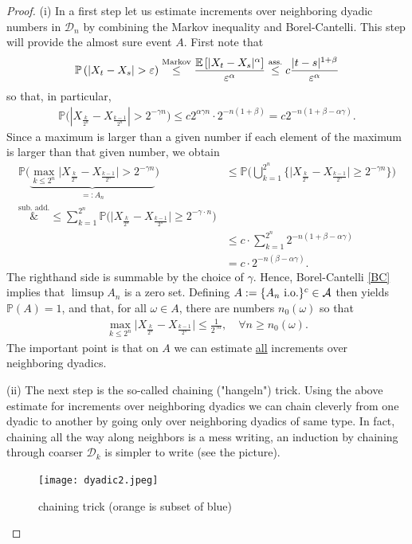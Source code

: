 \begin{proof}[Proof]
	(i) In a first step let us estimate increments over neighboring dyadic numbers in $\mathcal D_n$ by combining the Markov inequality and Borel-Cantelli. This step will provide the almost sure event $A$. First note that 
			\begin{align}\label{P}
				\mathbb{P}\left(\lvert X_t - X_s \rvert > \varepsilon \right) \overset{\text{Markov}}{\leq}  \frac{\mathbb{E}\left[ \lvert X_t - X_s \rvert^{\alpha} \right]}{\varepsilon^{\alpha}} \overset{\text{ass.}}{\leq} c  \frac{\lvert t -s \rvert^{1+\beta}}{\varepsilon^{\alpha}}
			\end{align}
			so that, in particular,
			\begin{align*}
				\mathbb{P}\big(| X_{\frac{k}{2^n}} - X_{\frac{k-1}{2^n}}| > 2^{-\gamma  n}\big) 
				\leq c  2^{\alpha \gamma n} \cdot 2^{-n(1+\beta)} 
				= c  2^{-n (1+\beta - \alpha \gamma)}.
			\end{align*}
			Since a maximum is larger than a given number if each element of the maximum is larger than that given number, we obtain
			\begin{align*}
				\mathbb{P} \big( \underbrace{\max_{k\leq 2^n} \lvert X_{\frac{k}{2^n}} - X_{\frac{k-1}{2^n}} \rvert > 2^{-\gamma  n}}_{=:A_n} \big) 
				&\leq \mathbb{P} \Big( \bigcup_{k=1}^{2^n} \big\{ \big\lvert X_{\frac{k}{2^n}} - X_{\frac{k-1}{2^n}}\big\rvert \geq 2^{-\gamma  n}\big\}\Big) \\
				\overset{\text{sub. add.}}&{\leq} \sum_{k=1}^{2^n} \mathbb{P}\big( \lvert X_{\frac{k}{2^n}} - X_{\frac{k-1}{2^n}}\big\rvert \geq 2^{-\gamma \cdot n}\big) \\
				&\leq c \cdot \sum_{k=1}^{2^n} 2^{-n (1+\beta - \alpha \gamma)} \\
				&= c \cdot 2^{-n(\beta - \alpha  \gamma)}.
			\end{align*}
			The righthand side is summable by the choice of $\gamma$. Hence, Borel-Cantelli \ref{BC} implies that $\limsup A_n$ is a zero set. Defining $A:= \{ A_n \text{ i.o.}\}^c \in \mathcal{A}$ then yields $\mathbb{P}(A)=1$, and that, for all $\omega \in A$, there are numbers $n_0(\omega)$ so that
			\begin{align}\label{kolmogorov_tight_eq1}
				\max_{k\leq 2^n} \big\lvert X_{\frac{k}{2^n}} - X_{\frac{k-1}{2^n}}\big\rvert \leq \frac{1}{2^{\gamma  n}}, \quad \forall n \geq n_0(\omega).
			\end{align}
			The important point is that on $A$ we can estimate \underline{all} increments over neighboring dyadics.\smallskip
		
		(ii) The next step is the so-called chaining ("hangeln") trick. Using the above estimate for increments over neighboring dyadics we can chain cleverly from one dyadic to another by going only over neighboring dyadics of same type. In fact, chaining all the way along neighbors is a mess writing, an induction by chaining through coarser $\mathcal D_k$ is simpler to write (see the picture).
		\begin{figure}[h]
			\begin{center}
				\texttt{[image: dyadic2.jpeg]}
				\caption*{chaining trick (orange is subset of blue)}
			\end{center}
			\end{figure}
		

\end{proof}
